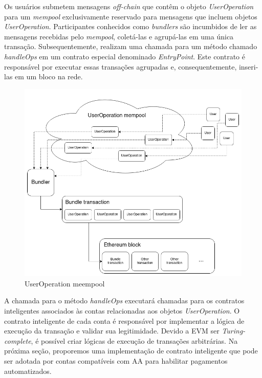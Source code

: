 \documentclass[12pt]{article}
\begin{document}
Os usuários submetem mensagens \textit{off-chain} que contêm o objeto \textit{UserOperation} para
um \textit{mempool} exclusivamente reservado para mensagens que incluem objetos
\textit{UserOperation}. Participantes conhecidos como \textit{bundlers} são incumbidos de ler as
mensagens recebidas pelo \textit{mempool}, coletá-las e agrupá-las em uma única transação.
Subsequentemente, realizam uma chamada para um método chamado \textit{handleOps} em um contrato
especial denominado \textit{EntryPoint}. Este contrato é responsável por executar essas transações
agrupadas e, consequentemente, inseri-las em um bloco na rede\cite{5}.

\begin{figure}[ht]
  \centering
  \includegraphics[width=.5\textwidth]{./images/user-operation-meenpool.png}
  \caption{UserOperation meempool}
  \label{fig:fig2}
\end{figure}

A chamada para o método \textit{handleOps} executará chamadas para os contratos inteligentes
associados às contas relacionadas aos objetos \textit{UserOperation}. O contrato inteligente de
cada conta é responsável por implementar a lógica de execução da transação e validar sua
legitimidade. Devido a EVM ser \textit{Turing-complete}, é possível criar lógicas de execução de
transações arbitrárias. Na próxima seção, proporemos uma implementação de contrato inteligente que
pode ser adotada por contas compatíveis com AA para habilitar pagamentos automatizados.

 
\end{document}
